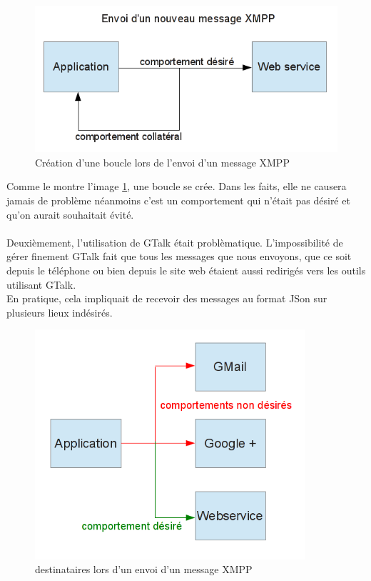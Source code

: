 \begin{figure}[!h]
	\center
	\includegraphics[width=12cm]{img/boucle-envoi-xmpp.png}
	\caption{Création d'une boucle lors de l'envoi d'un message XMPP}
	\label{boucle-envoi-xmpp}
\end{figure}

Comme le montre l'image \ref{boucle-envoi-xmpp}, une boucle se crée. Dans les faits, elle ne causera jamais de problème 
néanmoins c'est un comportement qui n'était pas désiré et qu'on aurait souhaitait évité.
\\\\
Deuxièmement, l'utilisation de GTalk était problèmatique. L'impossibilité de gérer finement GTalk fait que
tous les messages que nous envoyons, que ce soit depuis le téléphone ou bien depuis le site web étaient
aussi redirigés vers les outils utilisant GTalk.
\\
En pratique, cela impliquait de recevoir des messages au format JSon sur plusieurs lieux indésirés.

\begin{figure}[!h]
	\center
	\includegraphics[width=10cm]{img/broadcast-xmpp.png}
	\caption{destinataires lors d'un envoi d'un message XMPP}
	\label{broadcast-xmpp}
\end{figure}


